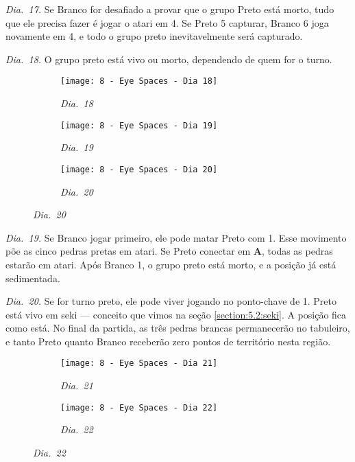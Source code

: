 \emph{Dia.\@~17.} Se Branco for desafiado a provar que o grupo Preto está morto, tudo que ele precisa fazer é jogar o atari em 4. Se Preto 5 capturar, Branco 6 joga novamente em 4, e todo o grupo preto inevitavelmente será capturado.

\pagebreak

\emph{Dia.\@~18.} O grupo preto está vivo ou morto, dependendo de quem for o turno.

\begin{figure}[h!]
    \centering
    \begin{subfigure}[t]{.31\textwidth}
        \texttt{[image: 8 - Eye Spaces - Dia 18]}
        \captionsetup{justification=centering}
        \caption*{\emph{Dia.\@~18}}
    \end{subfigure}
    \hfill
    \begin{subfigure}[t]{.31\textwidth}
        \texttt{[image: 8 - Eye Spaces - Dia 19]}
        \captionsetup{justification=centering}
        \caption*{\emph{Dia.\@~19}}
    \end{subfigure}
    \hfill
    \begin{subfigure}[t]{.31\textwidth}
        \texttt{[image: 8 - Eye Spaces - Dia 20]}
        \captionsetup{justification=centering}
        \caption*{\emph{Dia.\@~20}}
    \end{subfigure}
\end{figure}

\emph{Dia.\@~19.} Se Branco jogar primeiro, ele pode matar Preto com 1. Esse movimento põe as cinco pedras pretas em atari. Se Preto conectar em \textbf{A}, todas as pedras estarão em atari. Após Branco 1, o grupo preto está morto, e a posição já está sedimentada.

\emph{Dia.\@~20.} Se for turno preto, ele pode viver jogando no ponto-chave de 1. Preto está vivo em seki --- conceito que vimos na seção \autoref{section:5.2:seki}. A posição fica como está. No final da partida, as três pedras brancas permanecerão no tabuleiro, e tanto Preto quanto Branco receberão zero pontos de território nesta região.

\begin{figure}[h!]
    \centering
    \begin{subfigure}[t]{.31\textwidth}
        \texttt{[image: 8 - Eye Spaces - Dia 21]}
        \captionsetup{justification=centering}
        \caption*{\emph{Dia.\@~21}}
    \end{subfigure}
    \hspace{1cm}
    \begin{subfigure}[t]{.31\textwidth}
        \texttt{[image: 8 - Eye Spaces - Dia 22]}
        \captionsetup{justification=centering}
        \caption*{\emph{Dia.\@~22}}
    \end{subfigure}
\end{figure}

